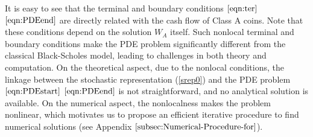 \documentclass[11pt]{article}%
\numberwithin{equation}{section}
\theoremstyle{plain}
\begin{document}
It is easy to see that the terminal and boundary conditions $\eqref{eqn:ter}$ \textendash{} $\eqref{eqn:PDEend}$ are directly related with the cash flow of Class A coins.
 Note that these conditions depend on the solution $W_{A}$ itself. Such nonlocal terminal and boundary conditions make the PDE problem significantly different from the classical Black-Scholes model, leading to challenges in both theory and computation. On the theoretical aspect, due to the nonlocal conditions, the linkage between the stochastic representation (\ref{srep0}) and the PDE problem $\eqref{eqn:PDEstart}$ \textendash{} $\eqref{eqn:PDEend}$ is not straightforward, and no analytical solution is available. On the numerical aspect, the nonlocalness makes the problem nonlinear, which motivates us to propose an efficient iterative procedure to find numerical solutions (see Appendix $\ref{subsec:Numerical-Procedure-for}$).
\end{document}
